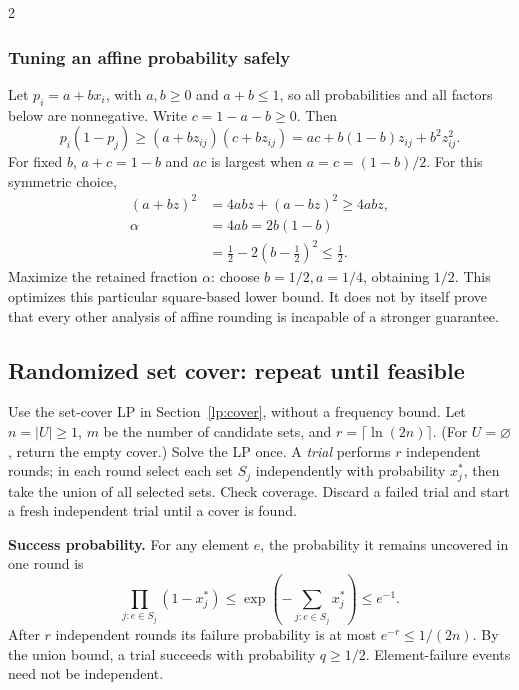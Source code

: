 \documentclass[8pt]{extarticle}
\theoremstyle{definition}
\begin{document}
\begin{multicols*}{2}
\subsubsection*{Tuning an affine probability safely}
Let $p_i=a+bx_i$, with $a,b\ge0$ and $a+b\le1$, so all probabilities and
all factors below are nonnegative. Write $c=1-a-b\ge0$. Then
\[
  p_i(1-p_j)\ge(a+bz_{ij})(c+bz_{ij})
    =ac+b(1-b)z_{ij}+b^2z_{ij}^2.
\]
For fixed $b$, $a+c=1-b$ and $ac$ is largest when
$a=c=(1-b)/2$. For this symmetric choice,
\[
\begin{aligned}
  (a+bz)^2&=4abz+(a-bz)^2\ge4abz,\\
  \alpha&=4ab=2b(1-b)\\
        &=\tfrac12-2(b-\tfrac12)^2\le\tfrac12.
\end{aligned}
\]
Maximize the retained fraction $\alpha$: choose $b=1/2,a=1/4$, obtaining
$1/2$. This optimizes this particular square-based lower bound. It does
not by itself prove that every other analysis of affine rounding is
incapable of a stronger guarantee.

\subsection{Randomized set cover: repeat until feasible}\label{lp:random-cover}
Use the set-cover LP in Section~\ref{lp:cover}, without a frequency bound.
Let $n=|U|\ge1$, $m$ be the number of candidate sets, and
$r=\lceil\ln(2n)\rceil$. (For $U=\varnothing$, return the empty cover.)
Solve the LP once. A \emph{trial} performs $r$ independent rounds; in each
round select each set $S_j$ independently with probability $x_j^*$, then
take the union of all selected sets. Check coverage. Discard a failed trial
and start a fresh independent trial until a cover is found.

\textbf{Success probability.}
For any element $e$, the probability it remains uncovered in one round is
\[
  \prod_{j:e\in S_j}(1-x_j^*)
    \le\exp\left(-\sum_{j:e\in S_j}x_j^*\right)\le e^{-1}.
\]
After $r$ independent rounds its failure probability is at most
$e^{-r}\le1/(2n)$. By the union bound, a trial succeeds with probability
$q\ge1/2$. Element-failure events need not be independent.


\end{multicols*}
\end{document}
